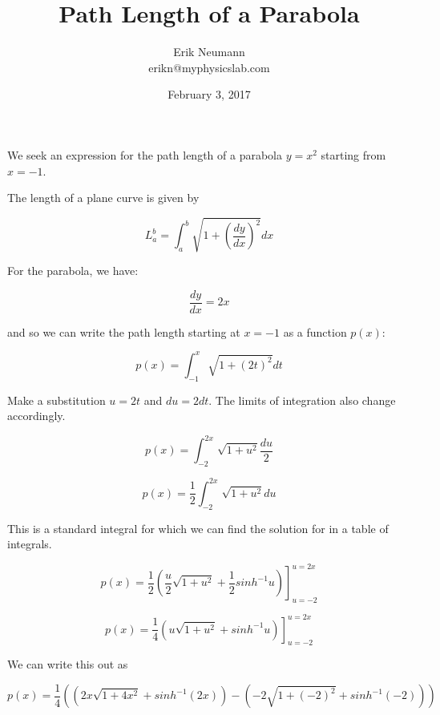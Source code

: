 \documentclass[final]{article}
\title{Path Length of a Parabola}
\author{Erik Neumann\\
erikn@myphysicslab.com}
\date{February 3, 2017}
\begin{document}
\maketitle

We seek an expression for the path length of a parabola $y = x^{2}$ starting from $x = -1$.

The length of a plane curve is given by

\begin{equation}
  L_{a}^{b} = \int_{a}^{b} \sqrt{ 1 + \left( \frac{dy}{dx} \right)^{2} } dx
\end{equation}

For the parabola, we have:

\begin{equation}
  \frac{dy}{dx} = 2x
\end{equation}

and so we can write the path length starting at $x = -1$ as a function $p(x)$:

\begin{equation}
  p(x) = \int_{-1}^{x} \sqrt{ 1 + (2t)^{2} } dt
\end{equation}

Make a substitution $u = 2t$ and $du = 2 dt$.  The limits of integration also change accordingly.

\begin{equation}
  p(x) = \int_{-2}^{2x} \sqrt{ 1 + u^{2} } \frac{du}{2}
\end{equation}

\begin{equation}
  p(x) = \frac{1}{2} \int_{-2}^{2x} \sqrt{ 1 + u^{2} } du
\end{equation}

This is a standard integral for which we can find the solution for in a table of integrals.

\begin{equation}
  p(x) = \left. \frac{1}{2} \left( \frac{u}{2} \sqrt{ 1 + u^{2} } +\frac{1}{2} sinh^{-1} u \right) \right]_{u=-2}^{u=2x}
\end{equation}

\begin{equation}
  p(x) = \left. \frac{1}{4} \left( u \sqrt{ 1 + u^{2} } + sinh^{-1} u \right) \right]_{u=-2}^{u=2x}
\end{equation}

We can write this out as

\begin{equation}
  p(x) = \frac{1}{4} \left( ( 2x \sqrt{ 1 + 4x^{2} } + sinh^{-1} (2x) ) - (-2 \sqrt{1 + (-2)^{2} } + sinh^{-1}(-2)) \right)
\end{equation}
\end{document}
